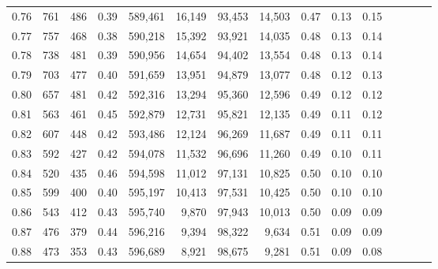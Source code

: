 \begin{tabular}{rrrcrrrrrrrrrrr}
0.76 &     761 &    486 &                                       0.39 &  589,461 &   16,149 &   93,453 &   14,503 &  0.47 &  0.13 &                         0.15 \\
0.77 &     757 &    468 &                                       0.38 &  590,218 &   15,392 &   93,921 &   14,035 &  0.48 &  0.13 &                         0.14 \\
0.78 &     738 &    481 &                                       0.39 &  590,956 &   14,654 &   94,402 &   13,554 &  0.48 &  0.13 &                         0.14 \\
0.79 &     703 &    477 &                                       0.40 &  591,659 &   13,951 &   94,879 &   13,077 &  0.48 &  0.12 &                         0.13 \\
0.80 &     657 &    481 &                                       0.42 &  592,316 &   13,294 &   95,360 &   12,596 &  0.49 &  0.12 &                         0.12 \\
0.81 &     563 &    461 &                                       0.45 &  592,879 &   12,731 &   95,821 &   12,135 &  0.49 &  0.11 &                         0.12 \\
0.82 &     607 &    448 &                                       0.42 &  593,486 &   12,124 &   96,269 &   11,687 &  0.49 &  0.11 &                         0.11 \\
0.83 &     592 &    427 &                                       0.42 &  594,078 &   11,532 &   96,696 &   11,260 &  0.49 &  0.10 &                         0.11 \\
0.84 &     520 &    435 &                                       0.46 &  594,598 &   11,012 &   97,131 &   10,825 &  0.50 &  0.10 &                         0.10 \\
0.85 &     599 &    400 &                                       0.40 &  595,197 &   10,413 &   97,531 &   10,425 &  0.50 &  0.10 &                         0.10 \\
0.86 &     543 &    412 &                                       0.43 &  595,740 &    9,870 &   97,943 &   10,013 &  0.50 &  0.09 &                         0.09 \\
0.87 &     476 &    379 &                                       0.44 &  596,216 &    9,394 &   98,322 &    9,634 &  0.51 &  0.09 &                         0.09 \\
0.88 &     473 &    353 &                                       0.43 &  596,689 &    8,921 &   98,675 &    9,281 &  0.51 &  0.09 &                         0.08 \\

\end{tabular}
